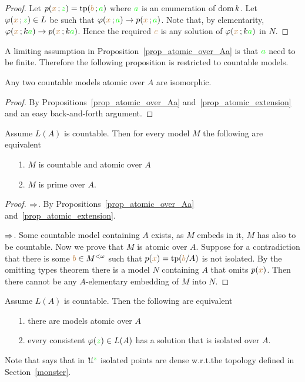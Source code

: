 \begin{proof}
Let $p({\color{brown} x}\,;{\color{green} z})={\rm tp}({\color{brown} b}\,;{\color{green} a})$ where ${\color{green} a}$ is an enumeration of $\mathop{\rm dom} k$.
Let $\varphi({\color{brown} x}\,;{\color{green} z})\in L$ be such that $\varphi({\color{brown} x}\,;{\color{green} a})\rightarrow p({\color{brown} x}\,;{\color{green} a})$.
Note that, by elementarity, $\varphi({\color{brown} x}\,;k{\color{green} a})\rightarrow p({\color{brown} x}\,;k{\color{green} a})$.
Hence the required ${\color{brown} c}$ is any solution of $\varphi({\color{brown} x}\,;k{\color{green} a})$ in $N$.
\end{proof}

A limiting assumption in Proposition~\ref{prop_atomic_over_Aa} is that ${\color{green} a}$ need to be finite.
Therefore the following proposition is restricted to countable models.

\begin{proposition}\label{prop_atomic_unique}
Any two countable models atomic over $A$ are isomorphic.
\end{proposition}

\begin{proof}
By Propositions~\ref{prop_atomic_over_Aa} and~\ref{prop_atomic_extension} and an easy back-and-forth argument.
\end{proof}

\begin{proposition} 
Assume $L(A)$ is countable.
Then for every model $M$ the following are equivalent
\begin{itemize}
\item[1.] $M$ is countable and atomic over $A$
\item[2.] $M$ is prime over $A$.
\end{itemize}
\end{proposition}

\begin{proof}
$\Rightarrow$. By Propositions~\ref{prop_atomic_over_Aa} and~\ref{prop_atomic_extension}.

$\Rightarrow$. Some countable model containing $A$ exists, as $M$ embeds in it, $M$ has also to be countable.
Now we prove that $M$ is atomic over $A$.
Suppose for a contradiction that there is some ${\color{brown} b}\in M^{<\omega}$ such that $p({\color{brown} x})={\rm tp}({\color{brown} b}/A)$ is not isolated.
By the omitting types theorem there is a model $N$ containing $A$ that omits $p({\color{brown} x})$.
Then there cannot be any $A$-elementary embedding of $M$ into $N$.
\end{proof}

\begin{proposition}\label{prop_idolated_type_dense}
Assume $L(A)$ is countable.
Then the following are equivalent
\begin{itemize}
\item[1.] there are models atomic over $A$
\item[2.] every consistent $\varphi({\color{green} z})\in L(A)$ has a solution that is isolated over $A$.
\end{itemize}
\end{proposition} 
Note that  says that in $\EuScript U^{\color{green} z}$ isolated points are dense w.r.t.\@ the topology defined in Section~\ref{monster}.

